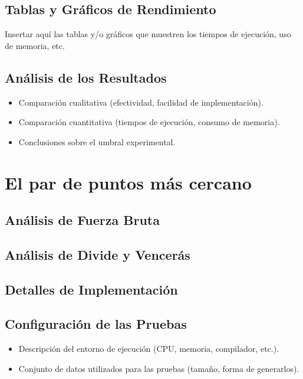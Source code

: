 \documentclass[a4paper,12pt]{article}
\begin{document}
\subsection{Tablas y Gráficos de Rendimiento}
Insertar aquí las tablas y/o gráficos que muestren los tiempos de ejecución,
uso de memoria, etc.

\subsection{Análisis de los Resultados}
\begin{itemize}
	\item Comparación cualitativa (efectividad, facilidad de implementación).
	\item Comparación cuantitativa (tiempos de ejecución, consumo de memoria).
	\item Conclusiones sobre el umbral experimental.
\end{itemize}



\section{El par de puntos más cercano}
\subsection{Análisis de Fuerza Bruta}

\subsection{Análisis de Divide y Vencerás}

\subsection{Detalles de Implementación}

\subsection{Configuración de las Pruebas}
\begin{itemize}
	\item Descripción del entorno de ejecución (CPU, memoria, compilador, etc.).
	\item Conjunto de datos utilizados para las pruebas (tamaño, forma de generarlos).
\end{itemize}
\end{document}
